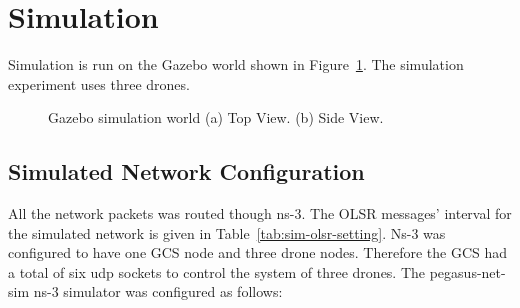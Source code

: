 \section{Simulation}

Simulation is run on the Gazebo world shown in Figure~\ref{fig:sim-world}. The simulation experiment uses three drones. 

\begin{figure}
	\centering
	\caption[Gazebo simulation world.]{\small Gazebo simulation world 
		(a) Top View. (b) Side View. }
	
	\label{fig:sim-world}
\end{figure}

\subsection{Simulated Network Configuration}

All the network packets was routed though ns-3. The OLSR messages' interval for the simulated network is given in Table~\ref{tab:sim-olsr-setting}. Ns-3 was configured to have one GCS node and three drone nodes. Therefore the GCS had a total of six udp sockets to control the system of three drones. The pegasus-net-sim ns-3 simulator was configured as follows:


